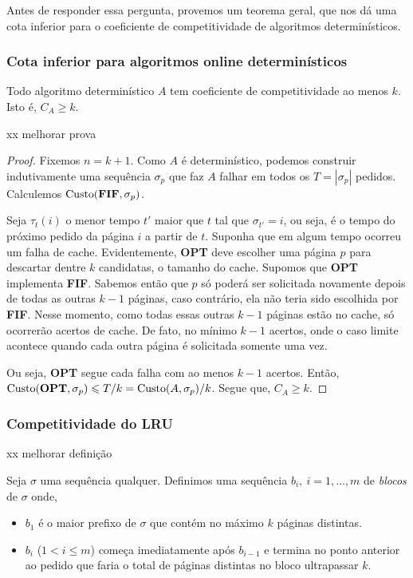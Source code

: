 \documentclass[a4paper,oneside,reqno,12pt]{amsart}
\begin{document}
Antes de responder essa pergunta, provemos um teorema geral, que nos dá uma cota inferior para o coeficiente de competitividade de algoritmos determinísticos.

\subsubsection{Cota inferior para algoritmos online determinísticos}

\begin{theorem}
\label{teorema1}
Todo algoritmo determinístico \(A\) tem coeficiente de competitividade ao menos \(k\). Isto é, \(C_A \geqslant k\).
\end{theorem}

 xx melhorar prova
\begin{proof}

  Fixemos \(n = k + 1\). Como \(A\) é determinístico, podemos construir indutivamente uma sequência \(\sigma_p\) que faz \(A\) falhar em todos os \(T = |\sigma_p|\) pedidos. Calculemos \(\text{Custo}(\bold{FIF}, \sigma_p)\). 

  Seja \(\tau_t(i)\) o menor tempo \(t'\) maior que \(t\) tal que \(\sigma_{t'} = i\), ou seja, é o tempo do próximo pedido da página \(i\) a partir de \(t\). Suponha que em algum tempo ocorreu um falha de cache. Evidentemente, \textbf{OPT} deve escolher uma página \(p\) para descartar dentre \(k\) candidatas, o tamanho do cache. Supomos que \textbf{OPT} implementa \textbf{FIF}. Sabemos então que \(p\) só poderá ser solicitada novamente depois de todas as outras \(k - 1\) páginas, caso contrário, ela não teria sido escolhida por \textbf{FIF}. Nesse momento, como todas essas outras \(k - 1\) páginas estão no cache, só ocorrerão acertos de cache. De fato, no mínimo \(k - 1\) acertos, onde o caso limite acontece quando cada outra página é solicitada somente uma vez.

  Ou seja, \textbf{OPT} segue cada falha com ao menos \(k-1\) acertos. Então, \(\text{Custo}(\bold{OPT}, \sigma_p) \leqslant T/k = \text{Custo}(A, \sigma_p)/ k\). Segue que, \(C_A \geqslant k\).
\end{proof}

\subsubsection{Competitividade do LRU}

\begin{definition}

  xx melhorar definição

  Seja \(\sigma\) uma sequência qualquer. Definimos uma sequência \(b_i, \ i = 1, \dots, m\) de \emph{blocos} de \(\sigma\) onde,
\begin{itemize}
    \item \(b_1\) é o maior prefixo de \(\sigma\) que contém no máximo \(k\) páginas distintas.
    \item \(b_i\) (\(1 < i \le m\)) começa imediatamente após \(b_{i-1}\) e termina no ponto anterior ao pedido que faria o total de páginas distintas no bloco ultrapassar \(k\). 
\end{itemize}

\end{definition}
\end{document}
